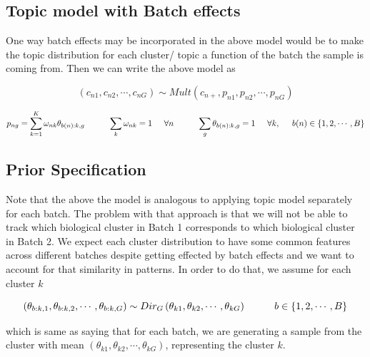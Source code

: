 \documentclass[]{article}
\begin{document}
\subsection{Topic model with Batch
effects}\label{topic-model-with-batch-effects}

One way batch effects may be incorporated in the above model would be to
make the topic distribution for each cluster/ topic a function of the
batch the sample is coming from. Then we can write the above model as

\begin{equation}
(c_{n1}, c_{n2}, \cdots, c_{nG}) \sim Mult (c_{n+}, p_{n1}, p_{n2}, \cdots, p_{nG})
\label{lab:mult}
\end{equation}

\begin{equation}
p_{ng} = \sum_{k=1}^{K} \omega_{nk} \theta_{b(n):k,g} \hspace{1 cm} \sum_{k} \omega_{nk} =1 \hspace{0.5 cm} \forall n \hspace{1 cm} \sum_{g} \theta_{b(n):k,g} =1 \hspace{0.5 cm} \forall k, \hspace{0.5 cm} b(n) \in \{1,2,\cdots, B \}
\end{equation}

\subsection{Prior Specification}\label{prior-specification}

Note that the above the model is analogous to applying topic model
separately for each batch. The problem with that approach is that we
will not be able to track which biological cluster in Batch 1
corresponds to which biological cluster in Batch 2. We expect each
cluster distribution to have some common features across different
batches despite getting effected by batch effects and we want to account
for that similarity in patterns. In order to do that, we assume for each
cluster \(k\)

\begin{equation}
(\theta_{b:k, 1}, \theta_{b:k, 2}, \cdots, \theta_{b:k, G}) \sim Dir_{G} \left ( \theta_{k1}, \theta_{k2}, \cdots, \theta_{kG} \right ) \hspace{1 cm} b \in \{1,2, \cdots, B \} 
\label{lab:prior}
\end{equation}

which is same as saying that for each batch, we are generating a sample
from the cluster with mean
\((\theta_{k1}, \theta_{k2}, \cdots, \theta_{kG})\), representing the
cluster \(k\).
\end{document}
